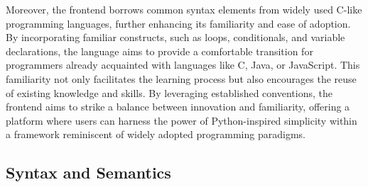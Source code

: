 \documentclass{l4proj}
\begin{document}
Moreover, the frontend borrows common syntax elements from widely used C-like programming languages, further enhancing its familiarity and ease of adoption.
By incorporating familiar constructs, such as loops, conditionals, and variable declarations, the language aims to provide a comfortable transition for programmers already acquainted with languages like C, Java, or JavaScript.
This familiarity not only facilitates the learning process but also encourages the reuse of existing knowledge and skills.
By leveraging established conventions, the frontend aims to strike a balance between innovation and familiarity, offering a platform where users can harness the power of Python-inspired simplicity within a framework reminiscent of widely adopted programming paradigms.
\clearpage
\subsection{Syntax and Semantics}
\end{document}
